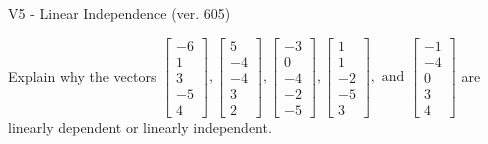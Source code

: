 \begin{exercise}
  \begin{exerciseTitle}V5 - Linear Independence (ver. 605)\end{exerciseTitle}
  \begin{exerciseStatement}
    Explain why the vectors \(\left[\begin{array}{r}
-6 \\
1 \\
3 \\
-5 \\
4
\end{array}\right] , \left[\begin{array}{r}
5 \\
-4 \\
-4 \\
3 \\
2
\end{array}\right] , \left[\begin{array}{r}
-3 \\
0 \\
-4 \\
-2 \\
-5
\end{array}\right] , \left[\begin{array}{r}
1 \\
1 \\
-2 \\
-5 \\
3
\end{array}\right] , \text{ and } \left[\begin{array}{r}
-1 \\
-4 \\
0 \\
3 \\
4
\end{array}\right]\) are linearly dependent or linearly independent.	



\end{exerciseStatement}
\end{exercise}

